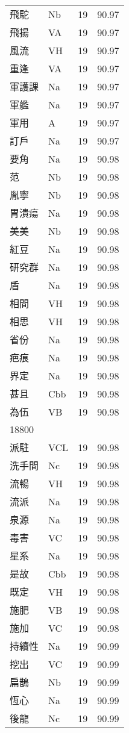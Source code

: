 \documentclass[twocolumn]{book}
\begin{document}
\begin{supertabular}{llrr}
飛駝 & Nb & 19 &  90.97\\
飛揚 & VA & 19 &  90.97\\
風流 & VH & 19 &  90.97\\
重逢 & VA & 19 &  90.97\\
軍護課 & Na & 19 &  90.97\\
軍艦 & Na & 19 &  90.97\\
軍用 & A & 19 &  90.97\\
訂戶 & Na & 19 &  90.97\\
要角 & Na & 19 &  90.98\\
范 & Nb & 19 &  90.98\\
胤寧 & Nb & 19 &  90.98\\
胃潰瘍 & Na & 19 &  90.98\\
美美 & Nb & 19 &  90.98\\
紅豆 & Na & 19 &  90.98\\
研究群 & Na & 19 &  90.98\\
盾 & Na & 19 &  90.98\\
相間 & VH & 19 &  90.98\\
相思 & VH & 19 &  90.98\\
省份 & Na & 19 &  90.98\\
疤痕 & Na & 19 &  90.98\\
界定 & Na & 19 &  90.98\\
甚且 & Cbb & 19 &  90.98\\
為伍 & VB & 19 &  90.98\\
18800\\
派駐 & VCL & 19 &  90.98\\
洗手間 & Nc & 19 &  90.98\\
流暢 & VH & 19 &  90.98\\
流派 & Na & 19 &  90.98\\
泉源 & Na & 19 &  90.98\\
毒害 & VC & 19 &  90.98\\
星系 & Na & 19 &  90.98\\
是故 & Cbb & 19 &  90.98\\
既定 & VH & 19 &  90.98\\
施肥 & VB & 19 &  90.98\\
施加 & VC & 19 &  90.98\\
持續性 & Na & 19 &  90.99\\
挖出 & VC & 19 &  90.99\\
扁鵲 & Nb & 19 &  90.99\\
恆心 & Na & 19 &  90.99\\
後龍 & Nc & 19 &  90.99\\

\end{supertabular}
\end{document}
